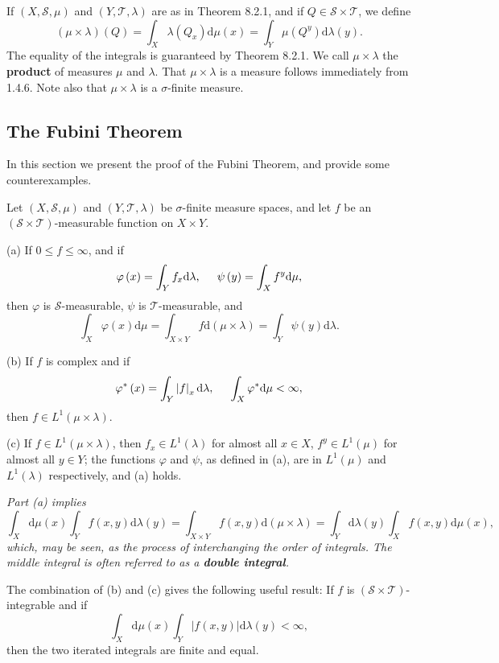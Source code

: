 If $(X,\mathscr{S},\mu)$ and $(Y,\mathscr{T},\lambda)$ are as in Theorem 8.2.1, and if $Q\in\mathscr{S}\times\mathscr{T}$, we define 
$$
\left( \mu \times \lambda \right) \left( Q \right) =\int_X{\lambda \left( Q_x \right) \mathrm{d}\mu \left( x \right)}=\int_Y{\mu \left( Q^y \right) \mathrm{d}\lambda \left( y \right)}.
$$
The equality of the integrals is guaranteed by Theorem 8.2.1. We call $\mu\times\lambda$ the \textbf{product} of measures $\mu$ and $\lambda$. That $\mu\times\lambda$ is a measure follows immediately from 1.4.6. Note also that $\mu\times\lambda$ is a $\sigma$-finite measure.
\subsection{The Fubini Theorem}
In this section we present the proof of the Fubini Theorem, and provide some counterexamples.
\begin{theorem}
Let $(X,\mathscr{S},\mu)$ and $(Y,\mathscr{T},\lambda)$ be $\sigma$-finite measure spaces, and let $f$ be an $(\mathscr{S}\times\mathscr{T})$-measurable function on $X\times Y$.\par
(a) If $0\le f\le\infty$, and if 
$$
\varphi \left( x \right) =\int_Y{f_x\mathrm{d}\lambda},\hspace{0.5cm}\psi \left( y \right) =\int_X{f^y\mathrm{d}\mu},
$$
then $\varphi$ is $\mathscr{S}$-measurable, $\psi$ is $\mathscr{T}$-measurable, and 
$$
\int_X{\varphi \left( x \right) \mathrm{d}\mu}=\int_{X\times Y}{f\mathrm{d}\left( \mu \times \lambda \right)}=\int_Y{\psi \left( y \right) \mathrm{d}\lambda}.
$$\par
(b) If $f$ is complex and if 
$$
\varphi ^*\left( x \right) =\int_Y{\left| f \right|_x\mathrm{d}\lambda},\hspace{0.5cm}\int_X{\varphi ^*\mathrm{d}\mu}<\infty ,
$$
then $f\in L^1(\mu\times\lambda)$.\par
(c) If $f\in L^1(\mu\times\lambda)$, then $f_x\in L^1(\lambda)$ for almost all $x\in X$, $f^y\in L^1(\mu)$ for almost all $y\in Y$; the functions $\varphi$ and $\psi$, as defined in (a), are in $L^1(\mu)$ and $L^1(\lambda)$ respectively, and (a) holds.
\end{theorem}
\begin{note}\em
Part (a) implies 
$$
\int_X{\mathrm{d}\mu \left( x \right) \int_Y{f\left( x,y \right) \mathrm{d}\lambda \left( y \right)}}=\int_{X\times Y}{f\left( x,y \right) \mathrm{d}\left( \mu \times \lambda \right)}=\int_Y{\mathrm{d}\lambda \left( y \right) \int_X{f\left( x,y \right) \mathrm{d}\mu \left( x \right)}},
$$
which, may be seen, as the process of interchanging the order of integrals. The middle integral is often referred to as a \textbf{double integral}.\par
The combination of (b) and (c) gives the following useful result: If $f$ is $(\mathscr{S}\times\mathscr{T})$-integrable and if 
$$
\int_X{\mathrm{d}\mu \left( x \right) \int_Y{\left| f\left( x,y \right) \right|\mathrm{d}\lambda \left( y \right)}}<\infty ,
$$
then the two iterated integrals are finite and equal.
\end{note}
